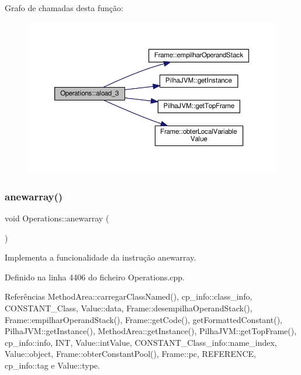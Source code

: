 Grafo de chamadas desta função\+:\nopagebreak
\begin{figure}[H]
\begin{center}
\leavevmode
\includegraphics[width=350pt]{classOperations_ac0cadd4fe7c17eab1985f11b5389fafc_cgraph}
\end{center}
\end{figure}
\mbox{\label{classOperations_aa5110e66aa565e9130be292935ef5c71}} 
\subsubsection{\texorpdfstring{anewarray()}{anewarray()}}
{\footnotesize\ttfamily void Operations\+::anewarray (\begin{DoxyParamCaption}{ }\end{DoxyParamCaption})\hspace{0.3cm}{\ttfamily [private]}}



Implementa a funcionalidade da instrução anewarray. 



Definido na linha 4406 do ficheiro Operations.\+cpp.



Referências Method\+Area\+::carregar\+Class\+Named(), cp\+\_\+info\+::class\+\_\+info, C\+O\+N\+S\+T\+A\+N\+T\+\_\+\+Class, Value\+::data, Frame\+::desempilha\+Operand\+Stack(), Frame\+::empilhar\+Operand\+Stack(), Frame\+::get\+Code(), get\+Formatted\+Constant(), Pilha\+J\+V\+M\+::get\+Instance(), Method\+Area\+::get\+Instance(), Pilha\+J\+V\+M\+::get\+Top\+Frame(), cp\+\_\+info\+::info, I\+NT, Value\+::int\+Value, C\+O\+N\+S\+T\+A\+N\+T\+\_\+\+Class\+\_\+info\+::name\+\_\+index, Value\+::object, Frame\+::obter\+Constant\+Pool(), Frame\+::pc, R\+E\+F\+E\+R\+E\+N\+CE, cp\+\_\+info\+::tag e Value\+::type.




